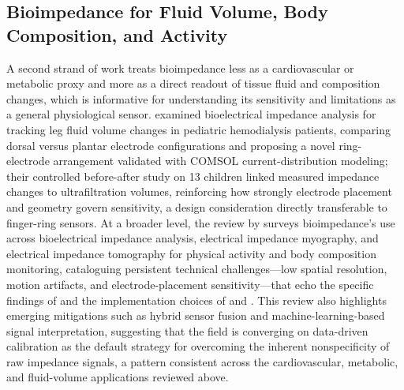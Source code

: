 \subsection{Bioimpedance for Fluid Volume, Body Composition, and Activity}
A second strand of work treats bioimpedance less as a cardiovascular or metabolic proxy and more as a direct readout of tissue fluid and composition changes, which is informative for understanding its sensitivity and limitations as a general physiological sensor. \cite{noori2025sensitivity} examined bioelectrical impedance analysis for tracking leg fluid volume changes in pediatric hemodialysis patients, comparing dorsal versus plantar electrode configurations and proposing a novel ring-electrode arrangement validated with COMSOL current-distribution modeling; their controlled before-after study on 13 children linked measured impedance changes to ultrafiltration volumes, reinforcing how strongly electrode placement and geometry govern sensitivity, a design consideration directly transferable to finger-ring sensors. At a broader level, the review by \cite{jacobs2026advancing} surveys bioimpedance's use across bioelectrical impedance analysis, electrical impedance myography, and electrical impedance tomography for physical activity and body composition monitoring, cataloguing persistent technical challenges---low spatial resolution, motion artifacts, and electrode-placement sensitivity---that echo the specific findings of \cite{noori2025sensitivity} and the implementation choices of \cite{sel2023continuous} and \cite{sanai2021evaluation}. This review also highlights emerging mitigations such as hybrid sensor fusion and machine-learning-based signal interpretation, suggesting that the field is converging on data-driven calibration as the default strategy for overcoming the inherent nonspecificity of raw impedance signals, a pattern consistent across the cardiovascular, metabolic, and fluid-volume applications reviewed above.

